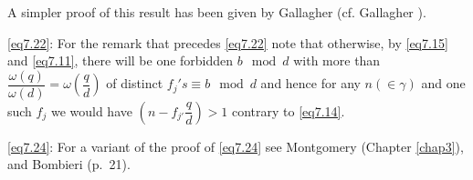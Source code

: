 A simpler proof of this result has been given by Gallagher \cite{key7}
(cf. Gallagher \cite{key6}). 

\eqref{eq7.22}: For the remark that precedes \eqref{eq7.22} note that
otherwise, by \eqref{eq7.15} and \eqref{eq7.11}, there will be one
forbidden $b \mod d$ with more than $\dfrac{\omega(q)}{\omega(d)} =
\omega(\dfrac{q}{d})$ of distinct $f_j 's \equiv b \mod d $ and hence
for any $n(\in \gamma )$ and one such $f_j$ we would have $(n-f_{j'}
\dfrac{q}{d})>1$ contrary to \eqref{eq7.14}. 

\eqref{eq7.24}: For a variant of the proof of \eqref{eq7.24} see
Montgomery \cite{key5} (Chapter \ref{chap3}), and Bombieri \cite{key6}
(p.~21). 

